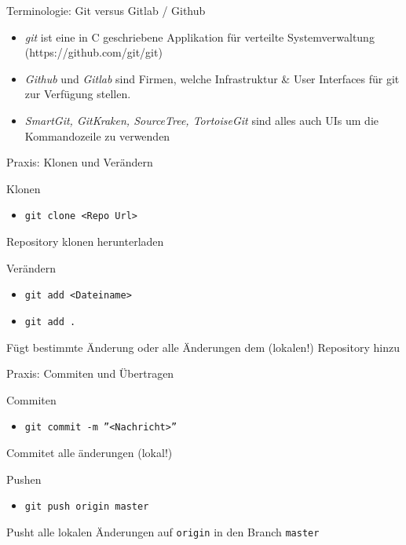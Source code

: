\documentclass{beamer}
\begin{document}
\begin{frame}{Terminologie: Git versus Gitlab / Github}
		\begin{itemize}
			\item \textit{git} ist eine in C geschriebene Applikation für verteilte Systemverwaltung (https://github.com/git/git)
			\item \textit{Github} und \textit{Gitlab} sind Firmen, welche Infrastruktur \& User Interfaces für git zur Verfügung stellen.
			\item \textit{SmartGit, GitKraken, SourceTree, TortoiseGit} sind alles auch UIs um die Kommandozeile zu verwenden
		\end{itemize}
\end{frame}

\begin{frame}{Praxis: Klonen und Verändern}
	\begin{block}{Klonen}
		\begin{itemize}
			\item \texttt{git clone <Repo Url> } 
		\end{itemize}
		Repository klonen \rightarrow herunterladen
	\end{block}
	\begin{block}{Verändern}
		\begin{itemize}
			\item \texttt{git add <Dateiname>}
			\item \texttt{git add .}
		\end{itemize}
		Fügt bestimmte Änderung oder alle Änderungen dem (lokalen!) Repository hinzu
	\end{block}
\end{frame}

\begin{frame}{Praxis: Commiten und Übertragen}
	\begin{block}{Commiten}
		\begin{itemize}
			\item \texttt{git commit -m ''<Nachricht>''}
		\end{itemize}
		Commitet alle änderungen (lokal!)
	\end{block}
	\begin{block}{Pushen}
		\begin{itemize}
			\item \texttt{git push origin master}
		\end{itemize}
		Pusht alle lokalen Änderungen auf \texttt{origin} in den Branch \texttt{master}
	\end{block}
\end{frame}
\end{document}
